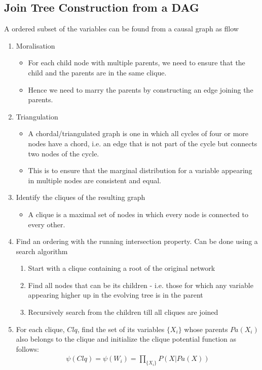 \documentclass[12pt,twoside]{article}
\begin{document}
\subsection{Join Tree Construction from a DAG}
A ordered subset of the variables can be found from a causal graph as fllow
\begin{enumerate}
	\item Moralisation
	\begin{itemize}
		\item For each child node with multiple parents, we need to ensure that the child and the parents are in the same clique.
		\item Hence we need to marry the parents by constructing an edge joining the parents.
	\end{itemize}
	
	\item Triangulation
	\begin{itemize}
		\item A chordal/triangulated graph is one in which all cycles of four or more nodes have a chord, i.e. an edge that is not part of the cycle but connects two nodes of the cycle. 
		\item This is to ensure that the marginal distribution for a variable appearing in multiple nodes are consistent and equal.
	\end{itemize}
	
	\item  Identify the cliques of the resulting graph
	\begin{itemize}
		\item  A clique is a maximal set of nodes in which every node is connected to every other.
	\end{itemize}		
	

	\item Find an ordering with the running intersection property. Can be done using a search algorithm
	\begin{enumerate}
		\item Start with a clique containing a root of the original network
		\item Find all nodes that can be its children - i.e. those for which any variable appearing higher up in the evolving tree is in the parent
		\item Recursively search from the children till all cliques are joined
	\end{enumerate}		
	
	
	\item For each clique, $Clq$, find the set of its variables $\lbrace X_i \rbrace$ whose parents $Pa(X_i)$ also belongs to the clique and initialize the clique potential function as follows:
	\begin{align*}
		\psi(Clq) = \psi(W_i) = \prod_{\lbrace X_i \rbrace} P(X\vert Pa(X))
	\end{align*}
\end{enumerate}
\end{document}
